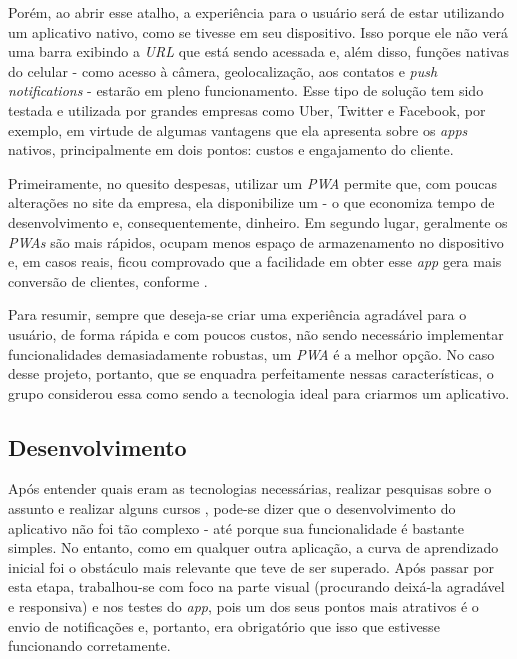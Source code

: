 Porém, ao abrir esse atalho, a experiência para o usuário será de estar utilizando um aplicativo nativo, como se tivesse  em seu dispositivo. Isso porque ele não verá uma barra exibindo a \textit{URL} que está sendo acessada e, além disso, funções nativas do celular - como acesso à câmera, geolocalização, aos contatos e \textit{push notifications} - estarão em pleno funcionamento. Esse tipo de solução tem sido testada e utilizada por grandes empresas como Uber, Twitter e Facebook, por exemplo, em virtude de algumas vantagens que ela apresenta sobre os \textit{apps} nativos, principalmente em dois pontos: custos e engajamento do cliente.


Primeiramente, no quesito despesas, utilizar um \textit{PWA} permite que, com poucas alterações no site da empresa, ela disponibilize um  - o que economiza tempo de desenvolvimento e, consequentemente, dinheiro. Em segundo lugar, geralmente os \textit{PWAs} são mais rápidos, ocupam menos espaço de armazenamento no dispositivo e, em casos reais, ficou comprovado que a facilidade em obter esse \textit{app} gera mais conversão de clientes, conforme \cite{Souza19} .

Para resumir, sempre que deseja-se criar uma experiência agradável para o usuário, de forma rápida e com poucos custos, não sendo necessário implementar funcionalidades demasiadamente robustas, um \textit{PWA} é a melhor opção. No caso desse projeto, portanto, que se enquadra perfeitamente nessas características, o grupo considerou essa como sendo a tecnologia ideal para criarmos um aplicativo.


\subsection{Desenvolvimento}
\label{subsec:desenvolvimento}

Após entender quais eram as tecnologias necessárias, realizar pesquisas sobre o assunto e realizar alguns cursos \online{}, pode-se dizer que o desenvolvimento do aplicativo não foi tão complexo - até porque sua funcionalidade é bastante simples. No entanto, como em qualquer outra aplicação, a curva de aprendizado inicial foi o obstáculo mais relevante que teve de ser superado. Após passar por esta etapa, trabalhou-se com foco na parte visual (procurando deixá-la agradável e responsiva) e nos testes do \textit{app}, pois um dos seus pontos mais atrativos é o envio de notificações e, portanto, era obrigatório que isso que estivesse funcionando corretamente. 

